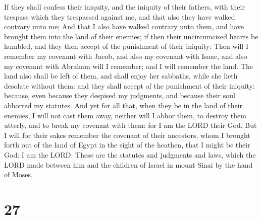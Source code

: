  If they shall confess their iniquity, and the iniquity of
their fathers, with their trespass which they trespassed against me, and
that also they have walked contrary unto me;  And that I
also have walked contrary unto them, and have brought them into the land
of their enemies; if then their uncircumcised hearts be humbled, and
they then accept of the punishment of their iniquity:  Then
will I remember my covenant with Jacob, and also my covenant with Isaac,
and also my covenant with Abraham will I remember; and I will remember
the land.  The land also shall be left of them, and shall
enjoy her sabbaths, while she lieth desolate without them: and they
shall accept of the punishment of their iniquity: because, even because
they despised my judgments, and because their soul abhorred my statutes.
 And yet for all that, when they be in the land of their
enemies, I will not cast them away, neither will I abhor them, to
destroy them utterly, and to break my covenant with them: for I am the
LORD their God.  But I will for their sakes remember the
covenant of their ancestors, whom I brought forth out of the land of
Egypt in the sight of the heathen, that I might be their God: I am the
LORD.  These are the statutes and judgments and laws, which
the LORD made between him and the children of Israel in mount Sinai by
the hand of Moses.

\hypertarget{section-26}{%
\section{27}\label{section-26}}

